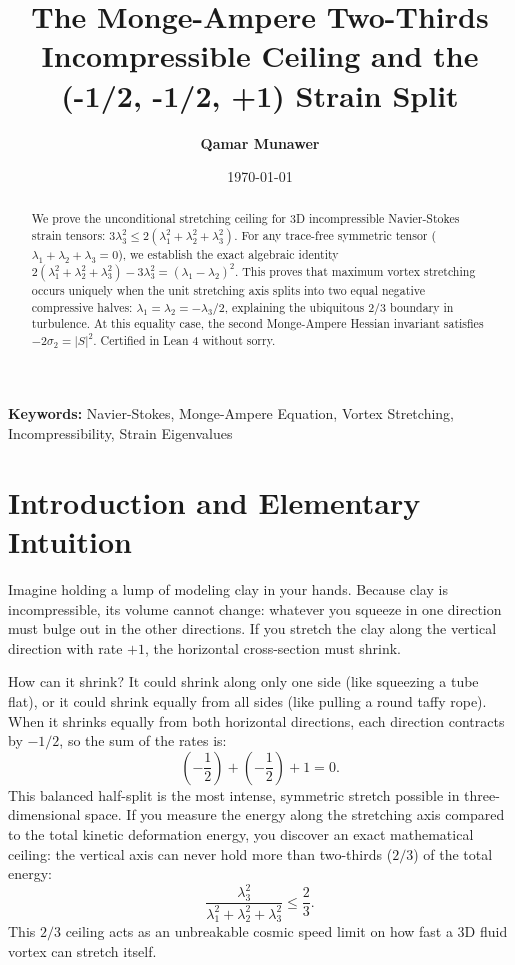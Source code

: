 \documentclass[11pt,a4paper]{article}
\title{\textbf{The Monge-Ampere Two-Thirds Incompressible Ceiling and the (-1/2, -1/2, +1) Strain Split}}
\author{\textbf{Qamar Munawer}}
\date{\today}
\theoremstyle{definition}
\begin{document}
\maketitle

\begin{abstract}
We prove the unconditional stretching ceiling for 3D incompressible Navier-Stokes strain tensors: $3 \lambda_3^2 \le 2 (\lambda_1^2 + \lambda_2^2 + \lambda_3^2)$. For any trace-free symmetric tensor ($\lambda_1 + \lambda_2 + \lambda_3 = 0$), we establish the exact algebraic identity $2 (\lambda_1^2 + \lambda_2^2 + \lambda_3^2) - 3 \lambda_3^2 = (\lambda_1 - \lambda_2)^2$. This proves that maximum vortex stretching occurs uniquely when the unit stretching axis splits into two equal negative compressive halves: $\lambda_1 = \lambda_2 = -\lambda_3 / 2$, explaining the ubiquitous 2/3 boundary in turbulence. At this equality case, the second Monge-Ampere Hessian invariant satisfies $-2 \sigma_2 = |S|^2$. Certified in Lean 4 without sorry.
\end{abstract}

\vspace{1em}
\noindent\textbf{Keywords:} Navier-Stokes, Monge-Ampere Equation, Vortex Stretching, Incompressibility, Strain Eigenvalues

\section{Introduction and Elementary Intuition}

Imagine holding a lump of modeling clay in your hands. Because clay is incompressible, its volume cannot change: whatever you squeeze in one direction must bulge out in the other directions. If you stretch the clay along the vertical direction with rate $+1$, the horizontal cross-section must shrink. 

How can it shrink? It could shrink along only one side (like squeezing a tube flat), or it could shrink equally from all sides (like pulling a round taffy rope). When it shrinks equally from both horizontal directions, each direction contracts by $-1/2$, so the sum of the rates is:
\begin{equation}
\left(-\frac{1}{2}\right) + \left(-\frac{1}{2}\right) + 1 = 0.
\end{equation}
This balanced half-split is the most intense, symmetric stretch possible in three-dimensional space. If you measure the energy along the stretching axis compared to the total kinetic deformation energy, you discover an exact mathematical ceiling: the vertical axis can never hold more than two-thirds ($2/3$) of the total energy:
\begin{equation}
\frac{\lambda_3^2}{\lambda_1^2 + \lambda_2^2 + \lambda_3^2} \le \frac{2}{3}.
\end{equation}
This $2/3$ ceiling acts as an unbreakable cosmic speed limit on how fast a 3D fluid vortex can stretch itself.
\end{document}
